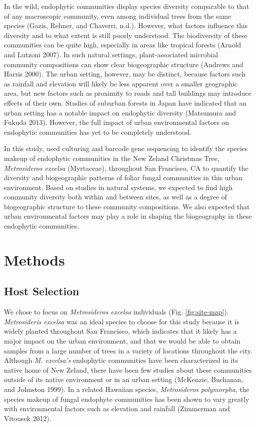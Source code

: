 \documentclass[fleqn,10pt,lineno]{wlpeerj} %
\begin{document}
In the wild, endophytic communities display species diversity comparable to that of any macroscopic community, even among individual trees from the same species (Gazis, Rehner, and Chaverri, n.d.). However, what factors influence this diversity and to what extent is still poorly understood. The biodiversity of these communities can be quite high, especially in areas like tropical forests (Arnold and Lutzoni 2007). In such natural settings, plant-associated microbial community compositions can show clear biogeographic structure (Andrews and Harris 2000). The urban setting, however, may be distinct, because factors such as rainfall and elevation will likely be less apparent over a smaller geographic area, but new factors such as proximity to roads and tall buildings may introduce effects of their own. Studies of suburban forests in Japan have indicated that an urban setting has a notable impact on endophytic diversity (Matsumura and Fukuda 2013). However, the full impact of urban environmental factors on endophytic communities has yet to be completely understood.

In this study, used culturing and barcode gene sequencing to identify the species makeup of endophytic communities in the New Zeland Christmas Tree, \emph{Metrosideros excelsa} (Myrtaceae), throughout San Francisco, CA to quantify the diversity and biogeographic patterns of foliar fungal communities in this urban environment. Based on studies in natural systems, we expected to find high community diversity both within and between sites, as well as a degree of biogeographic structure to these community compositions. We also expected that urban environmental factors may play a role in shaping the biogeography in these endophytic communities.

\hypertarget{methods}{%
\section*{Methods}\label{methods}}

\hypertarget{host-selection}{%
\subsection*{Host Selection}\label{host-selection}}

We chose to focus on \emph{Metrosideros excelsa} individuals (Fig. \ref{fig:site-map}). \emph{Metrosideris excelsa} was an ideal species to choose for this study because it is widely planted throughout San Francisco, which indicates that it likely has a major impact on the urban environment, and that we would be able to obtain samples from a large number of trees in a variety of locations throughout the city. Although \emph{M. excelsa's} endophytic communities have been characterized in its native home of New Zeland, there have been few studies about these communities outside of its native environment or in an urban setting (McKenzie, Buchanan, and Johnston 1999). In a related Hawaiian species, \emph{Metrosideros polymorpha}, the species makeup of fungal endophyte communities has been shown to vary greatly with environmental factors such as elevation and rainfall (Zimmerman and Vitousek 2012).
\end{document}
